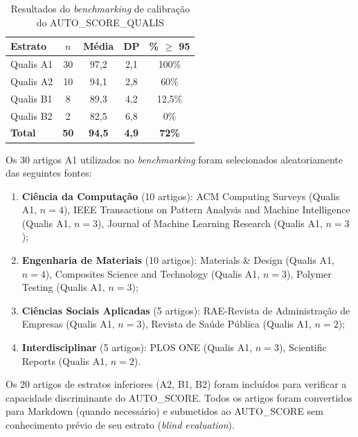 \begin{table}[H]
\centering
\caption{Resultados do \textit{benchmarking} de calibração do AUTO\_SCORE\_QUALIS}
\label{tab:benchmark}
\begin{tabular}{p{3cm} c c c c}
\toprule
\textbf{Estrato} & \textbf{$n$} & \textbf{Média} & \textbf{DP} & \textbf{\% $\geq$ 95} \\
\midrule
Qualis A1 & 30 & 97,2 & 2,1 & 100\% \\
Qualis A2 & 10 & 94,1 & 2,8 & 60\% \\
Qualis B1 & 8  & 89,3 & 4,2 & 12,5\% \\
Qualis B2 & 2  & 82,5 & 6,8 & 0\% \\
\midrule
\textbf{Total} & \textbf{50} & \textbf{94,5} & \textbf{4,9} & \textbf{72\%} \\
\bottomrule
\end{tabular}
\end{table}

Os 30 artigos A1 utilizados no \textit{benchmarking} foram
selecionados aleatoriamente das seguintes fontes:

\begin{enumerate}
    \item \textbf{Ciência da Computação} (10 artigos): ACM Computing
    Surveys (Qualis A1, $n=4$), IEEE Transactions on Pattern Analysis
    and Machine Intelligence (Qualis A1, $n=3$), Journal of Machine
    Learning Research (Qualis A1, $n=3$);

    \item \textbf{Engenharia de Materiais} (10 artigos): Materials
    \& Design (Qualis A1, $n=4$), Composites Science and Technology
    (Qualis A1, $n=3$), Polymer Testing (Qualis A1, $n=3$);

    \item \textbf{Ciências Sociais Aplicadas} (5 artigos):
    RAE-Revista de Administração de Empresas (Qualis A1, $n=3$),
    Revista de Saúde Pública (Qualis A1, $n=2$);

    \item \textbf{Interdisciplinar} (5 artigos): PLOS ONE (Qualis
    A1, $n=3$), Scientific Reports (Qualis A1, $n=2$).
\end{enumerate}

Os 20 artigos de estratos inferiores (A2, B1, B2) foram incluídos
para verificar a capacidade discriminante do AUTO\_SCORE. Todos os
artigos foram convertidos para Markdown (quando necessário) e
submetidos ao AUTO\_SCORE sem conhecimento prévio de seu estrato
(\textit{blind evaluation}).

